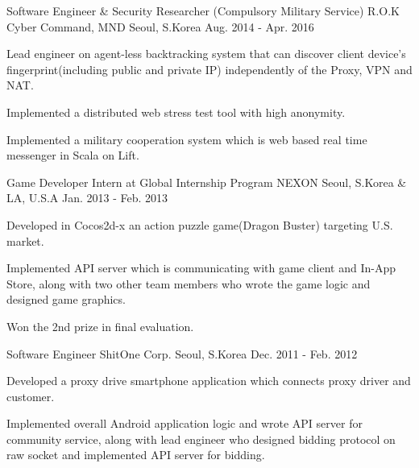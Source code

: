 \begin{cventries}
  \cventry
    {Software Engineer \& Security Researcher (Compulsory Military Service)} %
    {R.O.K Cyber Command, MND} %
    {Seoul, S.Korea} %
    {Aug. 2014 - Apr. 2016} %
    {
      \begin{cvitems} %
        \item {Lead engineer on agent-less backtracking system that can discover client device's fingerprint(including public and private IP) independently of the Proxy, VPN and NAT.}
        \item {Implemented a distributed web stress test tool with high anonymity.}
        \item {Implemented a military cooperation system which is web based real time messenger in Scala on Lift.}
      \end{cvitems}
    }

  \cventry
    {Game Developer Intern at Global Internship Program} %
    {NEXON} %
    {Seoul, S.Korea \& LA, U.S.A} %
    {Jan. 2013 - Feb. 2013} %
    {
      \begin{cvitems} %
        \item {Developed in Cocos2d-x an action puzzle game(Dragon Buster) targeting U.S. market.}
        \item {Implemented API server which is communicating with game client and In-App Store, along with two other team members who wrote the game logic and designed game graphics.}
        \item {Won the 2nd prize in final evaluation.}
      \end{cvitems}
    }

  \cventry
    {Software Engineer} %
    {ShitOne Corp.} %
    {Seoul, S.Korea} %
    {Dec. 2011 - Feb. 2012} %
    {
      \begin{cvitems} %
        \item {Developed a proxy drive smartphone application which connects proxy driver and customer.}
        \item {Implemented overall Android application logic and wrote API server for community service, along with lead engineer who designed bidding protocol on raw socket and implemented API server for bidding.}
      \end{cvitems}
    }


\end{cventries}
